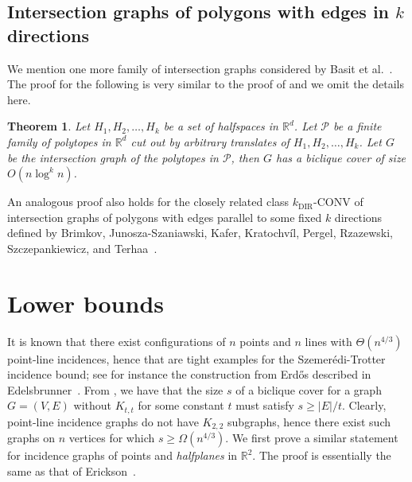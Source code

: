 \documentclass{amsart}
\newtheorem{theorem}{Theorem}%
\begin{document}
\subsection{Intersection graphs of polygons with edges in $k$ directions}

We mention one more family of intersection graphs considered by Basit et al.~\cite{BCSTT21}. The proof for the following is very similar to the proof of  and we omit the details here.

\begin{theorem}
    Let $H_1,H_2,\ldots, H_k$ be a set of halfspaces in $\mathbb{R}^d$. Let $\mathcal{P}$ be a finite family of polytopes in $\mathbb{R}^d$ cut out by arbitrary translates of $H_1,H_2,\ldots, H_k$. Let $G$ be the intersection graph of the polytopes in $\mathcal{P}$, then $G$ has a biclique cover of size $O(n \log^k n)$. 
\end{theorem}

An analogous proof also holds for the closely related class $k_{\text{DIR}}$-$\text{CONV}$ of intersection graphs of polygons with edges parallel to some fixed $k$ directions defined by Brimkov, Junosza-Szaniawski, Kafer, Kratochv\'{i}l,
Pergel, Rzazewski, Szczepankiewicz, and Terhaa~\cite{BJKKPRST18}.



\section{Lower bounds}
\label{sec:lb}

It is known that there exist configurations of $n$ points and $n$ lines with $\Theta(n^{4/3})$ point-line incidences, hence that are tight examples for the Szemer\'edi-Trotter incidence bound; see for instance the construction from Erd\H{o}s described in Edelsbrunner~\cite{MR904271}.
From , we have that the size $s$ of a biclique cover for a graph $G=(V,E)$ without $K_{t,t}$ for some constant $t$ must satisfy $s\geq |E|/t$. Clearly, point-line incidence graphs do not have $K_{2,2}$ subgraphs, hence there exist such graphs on $n$ vertices for which $s\geq \Omega(n^{4/3})$. We first prove a similar statement for incidence graphs of points and \emph{halfplanes} in $\mathbb{R}^2$.
The proof is essentially the same as that of Erickson~\cite[Theorem 3.4]{E96}. 
\end{document}
